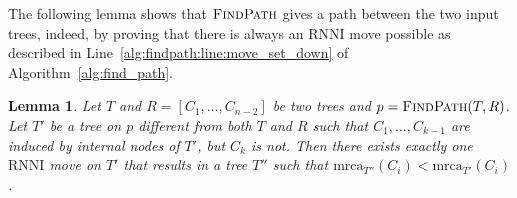 \documentclass{amsart}
\newcommand{\mrca}{\mathrm{mrca}}
\newcommand{\rnni}{\mathrm{RNNI}}
\newcommand{\findpath}{\textsc{FindPath}}
\newtheorem{lemma}[definition]{Lemma}
\begin{document}
The following lemma shows that $\findpath$ gives a path between the two input trees, indeed, by proving that there is always an $\rnni$ move possible as described in Line~\ref{alg:findpath:line:move_set_down} of Algorithm~\ref{alg:find_path}.

\begin{lemma}
Let $T$ and $R = [C_1, \ldots, C_{n-2}]$ be two trees and
$p = \findpath (T,R)$.
Let $T'$ be a tree on $p$ different from both $T$ and $R$ such that $C_1, \ldots, C_{k-1}$ are induced by internal nodes of $T'$, but $C_k$ is not.
Then there exists exactly one $\rnni$ move on $T'$ that results in a tree $T''$ such that
$\mrca_{T''}(C_i) < \mrca_{T'}(C_i)$.
\label{lemma:mrca_move}
\end{lemma}
\end{document}
